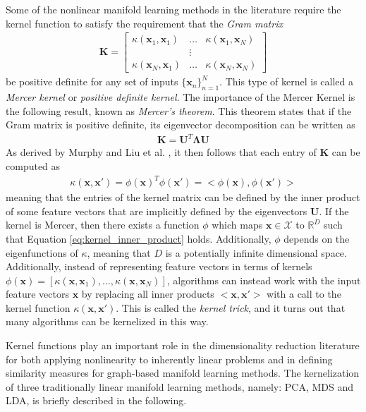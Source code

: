 Some of the nonlinear manifold learning methods in the literature require the kernel function to satisfy the requirement that the \textit{Gram matrix}
\begin{align}
	\bm{K} = 	
	\begin{bmatrix}
		\kappa(\bm{x}_{1},\bm{x}_{1}) &  \dots & \kappa(\bm{x}_{1},\bm{x}_{N}) \\
		 & \vdots  & \\
		\kappa(\bm{x}_{N},\bm{x}_{1}) & \dots & \kappa(\bm{x}_{N},\bm{x}_{N})
	\end{bmatrix}
\end{align}
\noindent
be positive definite for any set of inputs $\{\bm{x}_{n}\}_{n=1}^{N}$.  This type of kernel is called a \textit{Mercer kernel} or \textit{positive definite kernel}.  The importance of the Mercer Kernel is the following result, known as \textit{Mercer's theorem}.  This theorem states that if the Gram matrix is positive definite, its eigenvector decomposition can be written as
\begin{align}
	\bm{K} = \bm{U}^{T}\bm{\Lambda}\bm{U}
\end{align}
As derived by Murphy and Liu et al. \citep{Murphy2012,Liu2010KernelAdaptiveFiltering}, it then follows that each entry of $\bm{K}$ can be computed as 
\begin{align}
	\kappa(\bm{x},\bm{x}') = \phi(\bm{x})^{T}\phi(\bm{x}') = <\phi(\bm{x}),\phi(\bm{x}')>
	\label{eq:kernel_inner_product}
\end{align}
meaning that the entries of the kernel matrix can be defined by the inner product of some feature vectors that are implicitly defined by the eigenvectors $\bm{U}$.  If the kernel is Mercer, then there exists a function $\phi$ which maps $\bm{x} \in \mathcal{X}$ to $\mathbb{R}^{D}$ such that Equation \ref{eq:kernel_inner_product} holds.  Additionally, $\phi$ depends on the eigenfunctions of $\kappa$, meaning that $D$ is a potentially infinite dimensional space.
Additionally, instead of representing feature vectors in terms of kernels $\phi(\bm{x}) = [\kappa(\bm{x},\bm{x}_{1}), \dots, \kappa(\bm{x},\bm{x}_{N})]$, algorithms can instead work with the input feature vectors $\bm{x}$ by replacing all inner products $<\bm{x},\bm{x}'>$ with a call to the kernel function $\kappa(\bm{x},\bm{x}')$.  This is called the \textit{kernel trick}, and it turns out that many algorithms can be kernelized in this way.

Kernel functions play an important role in the dimensionality reduction literature for both applying nonlinearity to inherently linear problems and in defining similarity measures for graph-based manifold learning methods.  The kernelization of three traditionally linear manifold learning methods, namely: PCA, MDS and LDA, is briefly described in the following.
